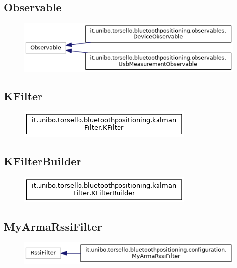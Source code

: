\subsection{Observable}
\begin{figure}[ph]
	\centering
	\includegraphics[scale=.55]{img/uml/inherit_graph/inherit_graph_14.png}
	\caption[]{}
\end{figure}

\newpage

\subsection{KFilter}
\begin{figure}[ph]
	\centering
	\includegraphics[scale=.55]{img/uml/inherit_graph/inherit_graph_11.png}
	\caption[]{}
\end{figure}

\subsection{KFilterBuilder}
\begin{figure}[ph]
	\centering
	\includegraphics[scale=.55]{img/uml/inherit_graph/inherit_graph_12.png}
	\caption[]{}
\end{figure}

\subsection{MyArmaRssiFilter}
\begin{figure}[ph]
	\centering
	\includegraphics[scale=.55]{img/uml/inherit_graph/inherit_graph_4.png}
	\caption[]{}
\end{figure}

